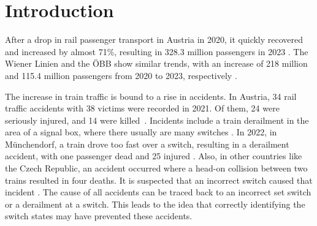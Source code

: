 \chapter{Introduction}
\label{sec:introduction}

After a drop in rail passenger transport in Austria in 2020, it quickly recovered and increased by almost 71\%, resulting in 328.3 million passengers in 2023 \cite{schienenpersonenverkehrAustria}.
The Wiener Linien and the ÖBB show similar trends, with an increase of 218 million and 115.4 million passengers from 2020 to 2023, respectively \cite{wienerLinienAustria} \cite{oebbAustria}.

The increase in train traffic is bound to a rise in accidents.
In Austria, 34 rail traffic accidents with 38 victims were recorded in 2021.
Of them, 24 were seriously injured, and 14 were killed~\cite{verkehrstatistik2022}.
Incidents include a train derailment in the area of a signal box, where there usually are many switches \cite{zugEntgleist}.
In 2022, in Münchendorf, a train drove too fast over a switch, resulting in a derailment accident, with one passenger dead and 25 injured \cite{zugUnfall1Tod}.
Also, in other countries like the Czech Republic, an accident occurred where a head-on collision between two trains resulted in four deaths.
It is suspected that an incorrect switch caused that incident \cite{zugUnfallFrontal}.
The cause of all accidents can be traced back to an incorrect set switch or a derailment at a switch.
This leads to the idea that correctly identifying the switch states may have prevented these accidents.

\vspace{0.5cm} %


